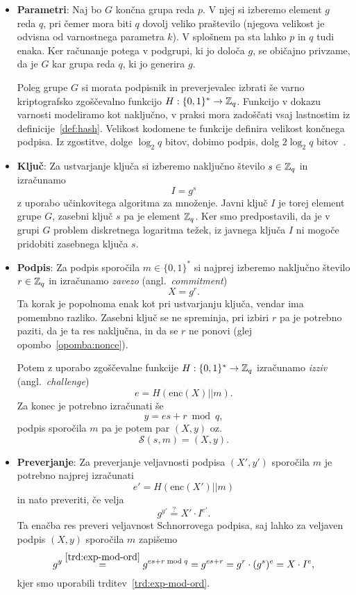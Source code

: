 \begin{itemize}
    \item \textbf{Parametri}:
    Naj bo $G$ končna grupa reda $p$. V njej si izberemo element $g$ reda $q$, pri čemer mora
    biti $q$ dovolj veliko praštevilo (njegova velikost je odvisna od varnostnega parametra $k$).
    V splošnem pa sta lahko $p$ in $q$ tudi enaka. Ker računanje potega v podgrupi, ki jo določa $g$,
    se običajno privzame, da je $G$ kar grupa reda $q$, ki jo generira $g$.

    Poleg grupe $G$ si morata podpisnik in preverjevalec izbrati še varno kriptografsko zgoščevalno
    funkcijo $H : \{0, 1\}^* \rightarrow \mathbb Z_q$. Funkcijo v dokazu varnosti modeliramo kot naključno,
    v praksi mora zadoščati vsaj lastnostim iz definicije~\ref{def:hash}. Velikost kodomene te funkcije
    definira velikost končnega podpisa. Iz zgostitve, dolge $\log_2 q$ bitov, dobimo podpis, dolg
    $2 \log_2 q$ bitov~\cite{stinson2023crypto}.
    \item \textbf{Ključ}:
    Za ustvarjanje ključa si izberemo naključno število $s \in \mathbb Z_q$ in izračunamo
    $$
    I = g^s
    $$
    z uporabo učinkovitega algoritma za množenje. Javni ključ $I$ je torej element grupe $G$, zasebni ključ
    $s$ pa je element $\mathbb Z_q$. Ker smo predpostavili, da je v grupi $G$ problem diskretnega logaritma
    težek, iz javnega ključa $I$ ni mogoče pridobiti zasebnega ključa $s$.

    \item \textbf{Podpis}:
    Za podpis sporočila $m \in \{0, 1\}^*$ si najprej izberemo naključno število $r \in \mathbb Z_q$ in izračunamo
    \textit{zavezo} (angl.\ \textit{commitment})
    $$
    X = g^r.
    $$
    Ta korak je popolnoma enak kot pri ustvarjanju ključa, vendar ima pomembno razliko. Zasebni
    ključ se ne spreminja, pri izbiri $r$ pa je potrebno paziti, da je ta res naključna, in da se
    $r$ ne ponovi (glej opombo~\ref{opomba:nonce}).

    Potem z uporabo zgoščevalne funkcije $H : \{0, 1\}^* \rightarrow \mathbb Z_q$ izračunamo \textit{izziv}
    (angl.\ \textit{challenge})
    $$
    e = H(\text{enc}(X) || m).
    $$
    Za konec je potrebno izračunati še
    $$ 
    y = es + r \bmod q,
    $$
    podpis sporočila $m$ pa je potem par $(X, y)$ oz.\
    $$ 
    \mathcal{S}(s, m) = (X, y).
    $$

    \item \textbf{Preverjanje}:
    Za preverjanje veljavnosti podpisa $(X', y')$ sporočila $m$ je potrebno najprej izračunati
    $$
    e' = H(\text{enc}(X') || m)
    $$
    in nato preveriti, če velja
    \begin{equation}
        g^{y'} \stackrel{?}{=} X' \cdot I^{e'}. \label{eq:gen-schnorr-ver}
    \end{equation}
    Ta enačba res preveri veljavnost Schnorrovega podpisa, saj lahko za veljaven podpis $(X, y)$
    sporočila $m$ zapišemo
    $$
    g^y \stackrel{\ref{trd:exp-mod-ord}}{=} g^{es + r \bmod q} = g^{es + r} = g^r \cdot (g^s)^e = X \cdot I^e,
    $$
    kjer smo uporabili trditev~\ref{trd:exp-mod-ord}.
\end{itemize}

